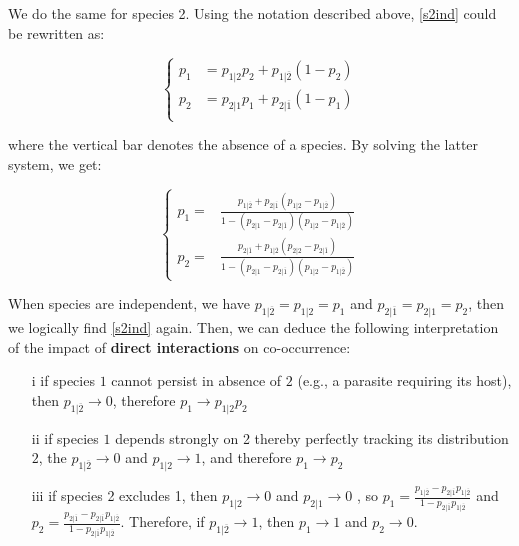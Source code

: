 We do the same for species 2. Using the notation described above, \eqref{s2ind} could be rewritten as:

  \begin{equation}
    \label{s2nind}
    \left\{ \begin{aligned}
      p_1&= p_{1|2}p_2+p_{1|\overline{2}}(1-p_2) \\
      p_2&= p_{2|1}p_1+p_{2|\overline{1}}(1-p_1)\\
    \end{aligned} \right.
  \end{equation}

where the vertical bar denotes the absence of a species. By solving the latter system,
we get:

  \begin{equation} \left\{ \begin{aligned} \label{sol2}
    p_1=&  \frac{p_{1|\overline{2}}+ p_{2|\overline{1}} (p_{1|2}- p_{1|\overline{2}})}{1- (p_{2|1}-p_{2|\overline{1}})( p_{1|2} - p_{1|\overline{2}})} \\
    p_2=& \frac{p_{2|\overline{1}}+p_{1|\overline{2}} (p_{2|2}- p_{2|\overline{1}})}{1- (p_{2|1}-p_{2|\overline{1}})( p_{1|2} - p_{1|\overline{2}})}
  \end{aligned} \right. \end{equation}

When species are independent, we have $p_{1|\overline{2}}=p_{1|2}=p_1$ and
$p_{2|\overline{1}}=p_{2|1}=p_2$, then we logically find \eqref{s2ind} again. Then, we can deduce
the following interpretation of the impact of \textbf{direct interactions} on co-occurrence:

  \begin{itemize}
    \item[i] if species $1$ cannot persist in absence of $2$ (e.g., a parasite requiring its host), then $p_{1|\overline{2}} \rightarrow 0$, therefore $p_1 \rightarrow p_{1|2}p_2$

    \item[ii] if species $1$ depends strongly on 2 thereby perfect­ly tracking its distribution $2$, the $p_{1|\overline{2}} \rightarrow 0$ and $p_{1|2} \rightarrow 1$, and therefore $p_1 \rightarrow p_2$

    \item[iii] if species 2 excludes 1, then $p_{1|2} \rightarrow 0$ and $p_{2|1} \rightarrow 0$ , so $p_1=\frac{p_{1|\overline{2}}-p_{2|\overline{1}}p_{1|\overline{2}}}{1-p_{2|\overline{1}}p_{1|\overline{2}}}$ and $p_2=\frac{p_{2|\overline{1}}-p_{2|\overline{1}}p_{1|\overline{2}}}{1-p_{2|\overline{1}}p_{1|\overline{2}}}$. Therefore, if $p_{1|\overline{2}} \rightarrow 1$, then $p_1\rightarrow1$ and $p_2\rightarrow0$.

  \end{itemize}

